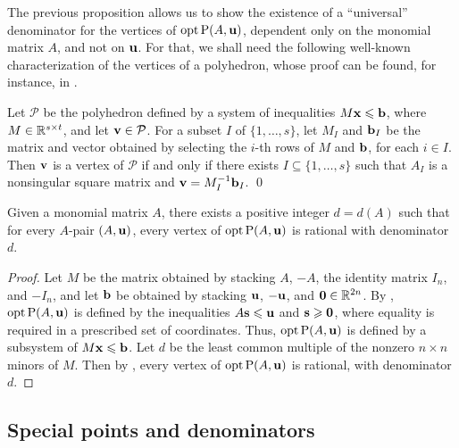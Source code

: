 \documentclass[11pt]{amsart}
\newcommand{\denom}{d}
\begin{document}
The previous proposition allows us to show the existence of a ``universal'' denominator for the vertices
of $\operatorname{opt}\mathrm{P}(A,\mathbf{u})$, dependent only on the monomial matrix $A$, and not on $\mathbf{u}$.
For that, we shall need the following well-known characterization of the vertices of a polyhedron, whose proof can be found, for instance, in \cite[Theorem~3.34]{conforti+etal.integer_programming}.

\begin{lemma}
   \label{prop: characterization of vertices}
   Let $\mathcal{P}$ be the polyhedron defined by a system of inequalities $M \mathbf{x} \leqslant \mathbf{b}$, where $M\in \mathbb{R}^{s\times t}$, and let $\mathbf{v} \in \mathcal{P}$.
   For a subset $I$ of $\{1,\ldots,s\}$, let $M_I$ and $\mathbf{b}_I$ be the matrix and vector obtained by selecting the $i$-th rows of $M$ and $\mathbf{b}$, for each $i\in I$.
   Then $\mathbf{v}$ is a vertex of $\mathcal{P}$ if and only if there exists $I \subseteq \{1,\ldots,s\}$ such that $A_I$ is a nonsingular square matrix and $\mathbf{v} = M_I^{-1}\mathbf{b}_I$.
\qed
\end{lemma}

\begin{theorem}
\label{uniform denominators for vertices:  T}
Given a monomial matrix $A$, there exists a positive integer $\denom = \denom(A)$ such that for every $A$-pair $(A, \mathbf{u})$, every vertex of $\operatorname{opt} \mathrm{P}(A, \mathbf{u})$ is rational with denominator $\denom$.
\end{theorem}

\begin{proof}
   Let $M$ be the matrix obtained by stacking $A$, $-A$, the identity matrix $I_n$, and $-I_n$, and let $\mathbf{b}$ be obtained by stacking $\mathbf{u}$, $-\mathbf{u}$, and $\mathbf{0}\in \mathbb{R}^{2n}$.
   By , $\operatorname{opt} \mathrm{P}(A,\mathbf{u})$ is defined by the inequalities $A\mathbf{s} \leqslant \mathbf{u}$ and $\mathbf{s}\geqslant \mathbf{0}$, where equality is required in a prescribed set of coordinates.
   Thus, $\operatorname{opt} \mathrm{P}(A,\mathbf{u})$ is defined by a subsystem of $M \mathbf{x} \leqslant \mathbf{b}$.
   Let $\denom$ be the least common multiple of the nonzero $n\times n$ minors of $M$.
   Then by , every vertex of $\operatorname{opt} \mathrm{P}(A,\mathbf{u})$ is rational, with denominator $\denom$.
\end{proof}

\subsection{Special points and denominators}
\end{document}
